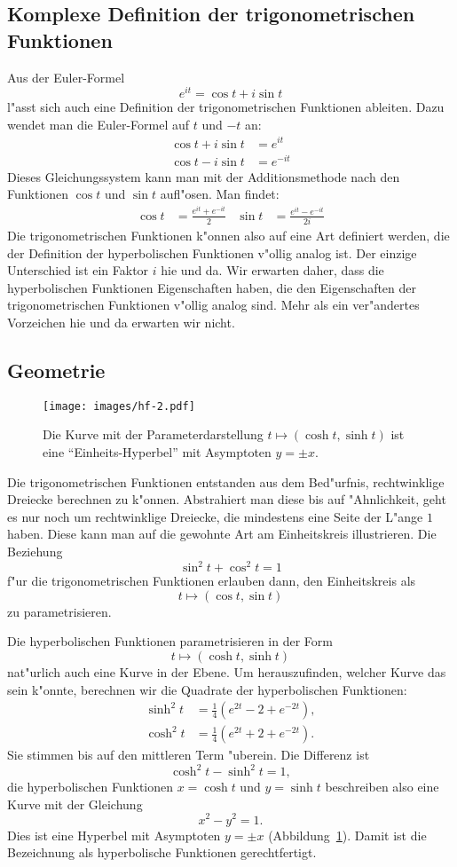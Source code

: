 \documentclass[a4paper,12pt]{article}
\begin{document}
\subsection{Komplexe Definition der trigonometrischen Funktionen}
Aus der Euler-Formel
\[
e^{it}=\cos t+i\sin t
\]
l"asst sich auch eine Definition der trigonometrischen Funktionen
ableiten. Dazu wendet man die Euler-Formel auf $t$ und $-t$ an:
\begin{align*}
\cos t+i\sin t&=e^{it}\\
\cos t-i\sin t&=e^{-it}
\end{align*}
Dieses Gleichungssystem kann man mit der Additionsmethode nach den
Funktionen $\cos t$ und $\sin t$ aufl"osen. Man findet:
\begin{align*}
\cos t
&=
\frac{e^{it}+e^{-it}}2
&
\sin t
&=
\frac{e^{it}-e^{-it}}{2i}
\end{align*}
Die trigonometrischen Funktionen k"onnen also auf eine Art definiert werden,
die der Definition der hyperbolischen Funktionen v"ollig analog ist.
Der einzige Unterschied ist ein Faktor $i$ hie und da.
Wir erwarten daher, dass die hyperbolischen Funktionen Eigenschaften
haben, die den Eigenschaften der trigonometrischen Funktionen v"ollig
analog sind.
Mehr als ein ver"andertes Vorzeichen hie und da erwarten wir nicht.


\subsection{Geometrie}
\begin{figure}
\centering
\texttt{[image: images/hf-2.pdf]}
\caption{Die Kurve mit der Parameterdarstellung
$t\mapsto (\cosh t, \sinh t)$ ist eine ``Einheits-Hyperbel'' mit 
Asymptoten $y=\pm x$.
\label{anhang:hyperbel}}
\end{figure}
Die trigonometrischen Funktionen entstanden aus dem Bed"urfnis, 
rechtwinklige Dreiecke berechnen zu k"onnen.
Abstrahiert man diese bis auf "Ahnlichkeit, geht es nur noch um rechtwinklige
Dreiecke, die mindestens eine Seite der L"ange $1$ haben.
Diese kann man auf die gewohnte Art am Einheitskreis illustrieren.
Die Beziehung 
\[
\sin^2t+\cos^2t=1
\]
f"ur die trigonometrischen Funktionen erlauben dann, den Einheitskreis als
\[
t\mapsto (\cos t,\sin t)
\]
zu parametrisieren.

Die hyperbolischen Funktionen parametrisieren in der Form
\[
t\mapsto (\cosh t, \sinh t)
\]
nat"urlich auch eine Kurve in der Ebene.
Um herauszufinden, welcher Kurve das sein k"onnte, berechnen wir die 
Quadrate der hyperbolischen Funktionen:
\begin{align}
\sinh^2 t&=\frac14(e^{2t}-2+e^{-2t}),
\\
\cosh^2 t&=\frac14(e^{2t}+2+e^{-2t}).
\label{hyp:definition}
\end{align}
Sie stimmen bis auf den mittleren Term "uberein.
Die Differenz ist 
\[
\cosh^2t - \sinh^2t=1,
\]
die hyperbolischen Funktionen $x=\cosh t$ und $y=\sinh t$
beschreiben also eine Kurve mit der Gleichung
\[
x^2-y^2=1.
\]
Dies ist eine Hyperbel mit Asymptoten $y=\pm x$
(Abbildung~\ref{anhang:hyperbel}).
Damit ist die Bezeichnung als hyperbolische Funktionen gerechtfertigt.
\end{document}

